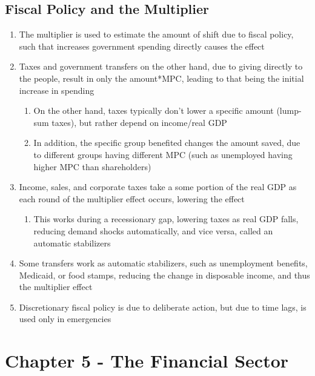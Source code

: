 \subsection{Fiscal Policy and the Multiplier}
\begin{enumerate}
\item The multiplier is used to estimate the amount of shift due to fiscal policy, such that increases government spending directly causes the effect
\item Taxes and government transfers on the other hand, due to giving directly to the people, result in only the amount*MPC, leading to that being the initial increase in spending
\begin{enumerate}
\item On the other hand, taxes typically don't lower a specific amount (lump-sum taxes), but rather depend on income/real GDP
\item In addition, the specific group benefited changes the amount saved, due to different groups having different MPC (such as unemployed having higher MPC than shareholders)
\end{enumerate}
\item Income, sales, and corporate taxes take a some portion of the real GDP as each round of the multiplier effect occurs, lowering the effect
\begin{enumerate}
\item This works during a recessionary gap, lowering taxes as real GDP falls, reducing demand shocks automatically, and vice versa, called an automatic stabilizers
\end{enumerate}
\item Some transfers work as automatic stabilizers, such as unemployment benefits, Medicaid, or food stamps, reducing the change in disposable income, and thus the multiplier effect
\item Discretionary fiscal policy is due to deliberate action, but due to time lags, is used only in emergencies
\end{enumerate}

\section{Chapter 5 - The Financial Sector}

